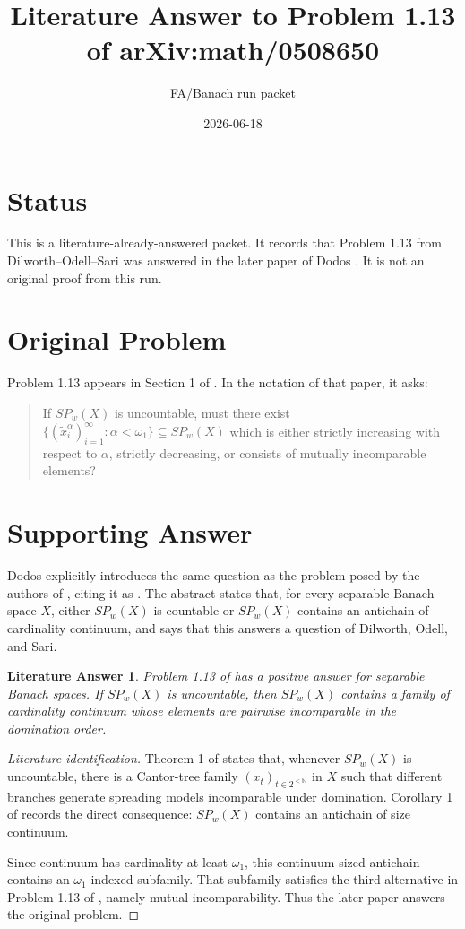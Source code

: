 \documentclass[11pt]{article}
\title{Literature Answer to Problem 1.13 of arXiv:math/0508650}
\author{FA/Banach run packet}
\date{2026-06-18}
\newtheorem*{theorem}{Literature Answer}
\begin{document}
\maketitle

\section*{Status}

This is a literature-already-answered packet. It records that Problem 1.13
from Dilworth--Odell--Sari \cite{DOS} was answered in the later paper of
Dodos \cite{Dodos}. It is not an original proof from this run.

\section*{Original Problem}

Problem 1.13 appears in Section 1 of \cite{DOS}. In the notation of that
paper, it asks:

\begin{quote}
If \(SP_w(X)\) is uncountable, must there exist
\(\{(\tilde x_i^\alpha)_{i=1}^\infty:\alpha<\omega_1\}\subseteq SP_w(X)\)
which is either strictly increasing with respect to \(\alpha\), strictly
decreasing, or consists of mutually incomparable elements?
\end{quote}

\section*{Supporting Answer}

Dodos \cite{Dodos} explicitly introduces the same question as the problem
posed by the authors of \cite{DOS}, citing it as \cite[Problem 1.13]{DOS}.
The abstract states that, for every separable Banach space \(X\), either
\(SP_w(X)\) is countable or \(SP_w(X)\) contains an antichain of cardinality
continuum, and says that this answers a question of Dilworth, Odell, and Sari.

\begin{theorem}
Problem 1.13 of \cite{DOS} has a positive answer for separable Banach spaces.
If \(SP_w(X)\) is uncountable, then \(SP_w(X)\) contains a family of
cardinality continuum whose elements are pairwise incomparable in the
domination order.
\end{theorem}

\begin{proof}[Literature identification]
Theorem 1 of \cite{Dodos} states that, whenever \(SP_w(X)\) is uncountable,
there is a Cantor-tree family \((x_t)_{t\in 2^{<\mathbb N}}\) in \(X\) such
that different branches generate spreading models incomparable under
domination. Corollary 1 of \cite{Dodos} records the direct consequence:
\(SP_w(X)\) contains an antichain of size continuum.

Since continuum has cardinality at least \(\omega_1\), this continuum-sized
antichain contains an \(\omega_1\)-indexed subfamily. That subfamily satisfies
the third alternative in Problem 1.13 of \cite{DOS}, namely mutual
incomparability. Thus the later paper answers the original problem.
\end{proof}
\end{document}
